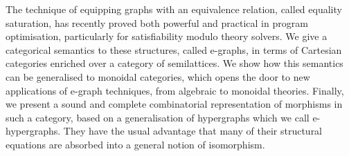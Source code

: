 The technique of equipping graphs with an equivalence relation, called equality saturation, has recently proved both powerful and practical in program optimisation, particularly for satisfiability modulo theory solvers. 
We give a categorical semantics to these structures, called e-graphs, in terms of Cartesian categories enriched over a category of semilattices.
We show how this semantics can be generalised to monoidal categories, which opens the door to new applications of e-graph techniques, from algebraic to monoidal theories.
Finally, we present a sound and complete combinatorial representation of morphisms in such a category,  based on a generalisation of hypergraphs which we call e-hypergraphs.
They have the usual advantage that many of their structural equations are absorbed into a general notion of isomorphism. 